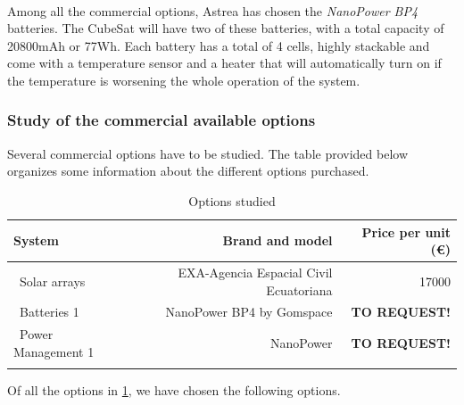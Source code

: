\paragraph{}Among all the commercial options, Astrea has chosen the \textit{NanoPower BP4} batteries. The CubeSat will have two of these batteries, with a total capacity of 20800mAh or 77Wh. Each battery has a total of 4 cells, highly stackable and come with a temperature sensor and a heater that will automatically turn on if the temperature is worsening the whole operation of the system. 

\subsubsection{Study of the commercial available options}
Several commercial options have to be studied. The table provided below organizes some information about the different options purchased.

\begin{longtable}{| l | r | r | }
\hline
\rowcolor[gray]{0.80}	\textbf{System} &  \textbf{Brand and model}     & \textbf{Price per unit (\euro)}   \\
\hline
\endfirsthead

	   ~Solar arrays & EXA-Agencia Espacial Civil Ecuatoriana & 17000 \\
	   ~Batteries 1 & NanoPower BP4 by Gomspace & \textbf{TO REQUEST!} \\
	   ~Power Management 1 & NanoPower & \textbf{TO REQUEST!} \\
	\hline

\caption{Options studied}
\label{epsoptionstable}
\end{longtable}

Of all the options in \ref{epsoptionstable}, we have chosen the following options.
